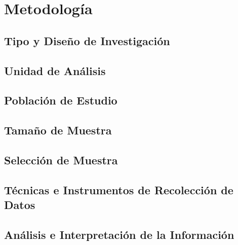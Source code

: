 \section{Metodología}

\subsection{Tipo y Diseño de Investigación}

\lipsum[78]

\subsection{Unidad de Análisis}

\lipsum[12]

\subsection{Población de Estudio}

\subsection{Tamaño de Muestra}

\subsection{Selección de Muestra}

\subsection{Técnicas e Instrumentos de Recolección de Datos}

\subsection{Análisis e Interpretación de la Información}